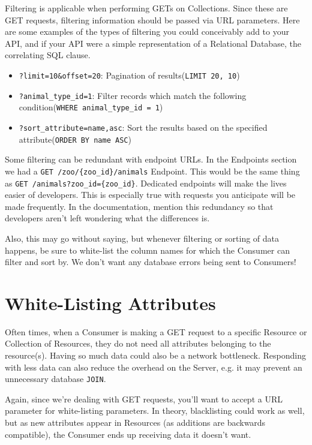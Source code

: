 \documentclass{book}
\begin{document}
Filtering is applicable when performing GETs on Collections. Since these are GET requests, filtering information should be passed via URL parameters. Here are some examples of the types of filtering you could conceivably add to your API, and if your API were a simple representation of a Relational Database, the correlating SQL clause.

\begin{itemize}
\item \texttt{?limit=10\&offset=20}: Pagination of results\newline{}(\texttt{LIMIT 20, 10})
\item \texttt{?animal\_type\_id=1}: Filter records which match the following condition\newline{}(\texttt{WHERE animal\_type\_id = 1})
\item \texttt{?sort\_attribute=name,asc}: Sort the results based on the specified attribute\newline{}(\texttt{ORDER BY name ASC})
\end{itemize}

Some filtering can be redundant with endpoint URLs. In the Endpoints section we had a \texttt{GET /zoo/\{zoo\_id\}/animals} Endpoint. This would be the same thing as \texttt{GET /animals?zoo\_id=\{zoo\_id\}}. Dedicated endpoints will make the lives easier of developers. This is especially true with requests you anticipate will be made frequently. In the documentation, mention this redundancy so that developers aren't left wondering what the differences is.

Also, this may go without saying, but whenever filtering or sorting of data happens, be sure to white-list the column names for which the Consumer can filter and sort by. We don't want any database errors being sent to Consumers!


\section{White-Listing Attributes}

Often times, when a Consumer is making a GET request to a specific Resource or Collection of Resources, they do not need all attributes belonging to the resource(s). Having so much data could also be a network bottleneck. Responding with less data can also reduce the overhead on the Server, e.g. it may prevent an unnecessary database \texttt{JOIN}.

Again, since we're dealing with GET requests, you'll want to accept a URL parameter for white-listing parameters. In theory, blacklisting could work as well, but as new attributes appear in Resources (as additions are backwards compatible), the Consumer ends up receiving data it doesn't want.
\end{document}
